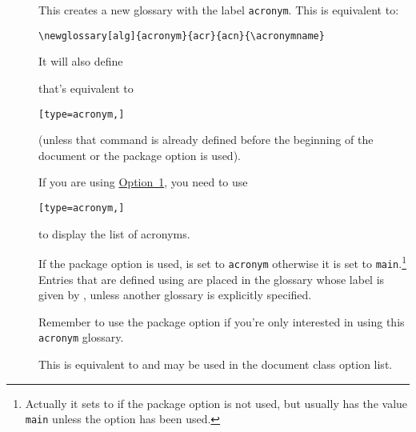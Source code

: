 \documentclass[report,inlinetitle]{nlctdoc}
\newcommand*{\opt}[1]{\hyperlink{option#1}{Option~#1}}
\begin{document}
\begin{description}
\item[] This creates a new glossary with the
label \texttt{acronym}. This is equivalent to:
\begin{verbatim}
\newglossary[alg]{acronym}{acr}{acn}{\acronymname}
\end{verbatim}
It will also define
\begin{definition}[\DescribeMacro\printacronyms]
\end{definition}
that's equivalent to
\begin{alltt}
[type=acronym,]
\end{alltt}
(unless that command is already defined before the beginning of the
document or the package option  is used).

If you are using \opt1, you need to use
\begin{alltt}
[type=acronym,]
\end{alltt}
to display the list of acronyms.

If the  package option is used, 
is set to \texttt{acronym} otherwise it is set to 
\texttt{main}.\footnote{Actually it sets  to
 if the  package option is
not used, but  usually has the value
\texttt{main} unless the  option has been used.} 
Entries that are defined using  are placed in
the glossary whose label is given by , unless
another glossary is explicitly specified.

\begin{important}
Remember to use the  package option if you're only
interested in using this \texttt{acronym} glossary.
\end{important}

\item[] This is equivalent to
 and may be used in the document class option
list.


\end{description}
\end{document}
